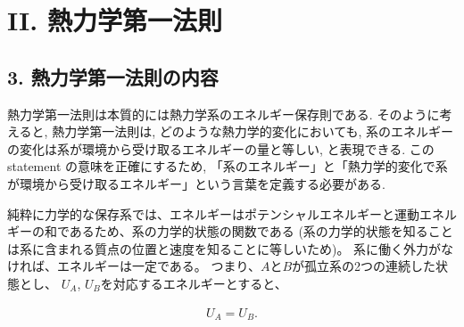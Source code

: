 
\chapter*{II. 熱力学第一法則}
\section*{3. 熱力学第一法則の内容}
熱力学第一法則は本質的には熱力学系のエネルギー保存則である.
そのように考えると, 熱力学第一法則は, どのような熱力学的変化においても, 系のエネルギーの変化は系が環境から受け取るエネルギーの量と等しい, と表現できる.
この statement の意味を正確にするため, 「系のエネルギー」と「熱力学的変化で系が環境から受け取るエネルギー」という言葉を定義する必要がある.\par
純粋に力学的な保存系では、エネルギーはポテンシャルエネルギーと運動エネルギーの和であるため、系の力学的状態の関数である (系の力学的状態を知ることは系に含まれる質点の位置と速度を知ることに等しいため)。
系に働く外力がなければ、エネルギーは一定である。
つまり、$A$と$B$が孤立系の2つの連続した状態とし、 $U_A$, $U_B$を対応するエネルギーとすると、

\begin{align}
    U_A = U_B.
\end{align}
